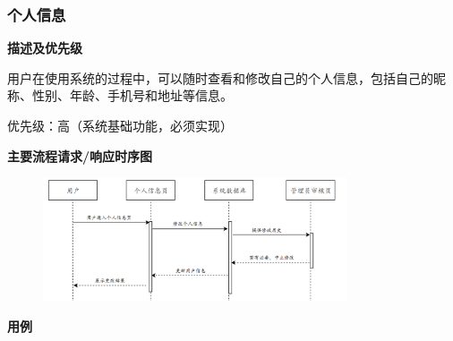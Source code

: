 \documentclass[12pt,a4paper,UTF8]{article}
\begin{document}
\subsubsection{个人信息}

\noindent\textbf{描述及优先级}

用户在使用系统的过程中，可以随时查看和修改自己的个人信息，包括自己的昵称、性别、年龄、手机号和地址等信息。

优先级：高（系统基础功能，必须实现）

\noindent\textbf{主要流程请求/响应时序图}

\begin{figure}[H]
  \centering
  \includegraphics[width=0.8\textwidth]{figures/use323.png}
\end{figure}

\noindent\textbf{用例}
\end{document}
